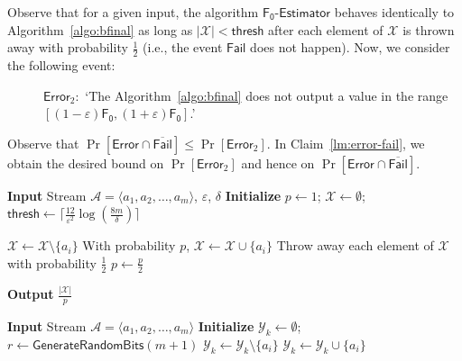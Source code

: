 \documentclass[a4paper,UKenglish,cleveref, autoref, thm-restate]{lipics-v2021}
\newcommand{\stream}{\mathcal{A}}
\newcommand{\hybrid}{\ensuremath{\mathsf{F_0\mbox{-}Estimator}}}
\newcommand{\Fo}{\ensuremath{\mathsf{F_0}}}
\newcommand{\Fail}{\mathsf{Fail}}
\newcommand{\Error}{\mathsf{Error}}
\newcommand{\thresh}{\mathsf{thresh}}
\begin{document}
Observe that for a given input, the algorithm {\hybrid} behaves identically to Algorithm~\ref{algo:bfinal} as long as $|\mathcal{X}| < \thresh$ after each element of $\mathcal{X}$ is thrown away with probability $\frac{1}{2}$ (i.e., the event $\Fail$ does not happen). 
Now, we consider the following event:

\begin{description}
\item[]$\Error_{2}:$ `The Algorithm~\ref{algo:bfinal} does not output a value in the range $[(1-\varepsilon)\Fo, (1+\varepsilon) \Fo]$.'
\end{description}

Observe that $\Pr[\Error \cap \overline{\mathsf{Fail}}] \leq \Pr[\Error_{2}]$.
In Claim~\ref{lm:error-fail}, we obtain the desired bound on $\Pr[\Error_{2}]$ and hence on   $\Pr [\mathsf{Error} \cap \overline{\mathsf{Fail}}]$.




\begin{algorithm}
\caption{}\label{algo:bfinal}

\begin{algorithmic}[1]
\Statex \textbf{Input} Stream $\stream = \langle a_1,a_2,\ldots,a_m \rangle$, $\varepsilon$, $\delta$
 \State \textbf{Initialize}  $p \gets 1$; $\mathcal{X} \gets \emptyset$; $\thresh \gets \lceil\frac{12}{\varepsilon^2}\log (\frac{8m}{\delta})\rceil$
 \label{line:bbeginfor}





\State $\mathcal{X} \gets \mathcal{X} \setminus \{a_i\}$\label{line:bfinal-drop}
\State With probability $p$, $\mathcal{X} \gets \mathcal{X} \cup \{a_i\}$ \label{line:bfinal-pick}
\If{$|\mathcal{X}|= \thresh$}\label{line:bIfbegin}
\State Throw away each element of $\mathcal{X}$ with probability $\frac{1}{2}$ \label{line:bhybrid-final-throw}
\State $p \gets \frac{p}{2}$ \label{line:bp}



\EndIf \label{line:bIfend}
\EndFor \label{line:bendfor}
\State \textbf{Output} $\frac{|\mathcal{X}|}{p}$\label{line:boutput}
\end{algorithmic}
\end{algorithm}


\begin{algorithm}
\caption{}\label{algo:cfinal}

\begin{algorithmic}[1]
\Statex \textbf{Input} Stream $\stream = \langle a_1,a_2,\ldots,a_m \rangle$ 
 \State \textbf{Initialize}  $\mathcal{Y}_{k} \gets \emptyset$; 
\EndFor
 \label{line:cbeginfor}
  \State $r \gets \mathsf{GenerateRandomBits}(m+1)$
 \State $\mathcal{Y}_{k} \gets \mathcal{Y}_{k} \setminus \{a_i\}$\label{line:cfinal-drop}
   $\mathcal{Y}_{k} \gets \mathcal{Y}_{k} \cup \{a_i\}$ \label{line:cfinal-pick}
 \EndIf 
 \EndFor
\EndFor \label{line:cendfor}

\end{algorithmic}
\end{algorithm}
\end{document}
